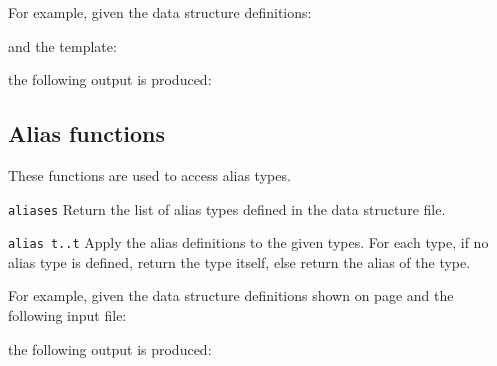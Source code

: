 For example, given the data structure definitions:
\begin{showfile}

\end{showfile}
and the template:
\begin{showfile}

\end{showfile}
the following output is produced:
\begin{showfile}

\end{showfile}

\subsection{Alias functions}
These functions are used to access alias types.
\begin{desctab}
\item[\texttt{aliases}]
Return the list of alias types defined in the data structure file.

\item[\texttt{alias t..t}]
Apply the alias definitions to the given types. For each type, if no alias
type is defined, return the type itself, else return the alias of the type.
\end{desctab}
For example, given the data structure definitions shown on page
\pageref{plotds} and the following input file:
\begin{showfile}

\end{showfile}
the following output is produced:
\begin{showfile}

\end{showfile}

